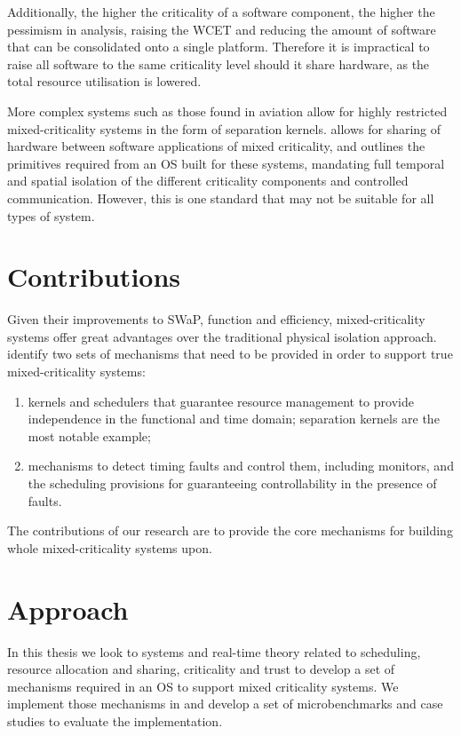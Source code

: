 Additionally, the higher the criticality
of a software component, the higher the pessimism in analysis, raising the \gls{WCET} and reducing
the amount of software that can be consolidated onto a single platform. Therefore it is 
impractical to raise all software to the same criticality level should it share hardware, as the
total resource utilisation is lowered.

More complex systems such as those found in aviation allow for highly
restricted mixed-criticality systems in the form of separation kernels.
\citet{ARINC653} allows for sharing of hardware between software applications
of mixed criticality, and outlines the primitives required from an \gls{OS}
built for these systems, mandating full temporal and spatial isolation of the
different criticality components and controlled communication. However, this is one 
standard that may not be suitable for all types of system.

\section{Contributions}

Given their improvements to \gls{SWaP}, function and efficiency, mixed-criticality systems offer
great advantages over the traditional physical isolation approach. 
\citet{Ernst_DiNatale_16} identify two sets of mechanisms that need to be provided in order to
support true mixed-criticality systems:

\begin{enumerate}
    \item kernels and schedulers that guarantee resource
        management to provide independence in the
        functional and time domain; separation kernels
        are the most notable example;
    \item mechanisms to detect timing faults and control
        them, including monitors, and the scheduling
        provisions for guaranteeing controllability in the
        presence of faults.
\end{enumerate}

The contributions of our research are to provide the core mechanisms for building whole
mixed-criticality systems upon. 

\section{Approach}

In this thesis we look to systems and real-time theory related to scheduling, resource allocation
and sharing, criticality and trust to develop a set of mechanisms required in an \gls{OS} to 
support mixed criticality systems. We implement those mechanisms in \selfour and develop a set of
microbenchmarks and case studies to evaluate the implementation. 

